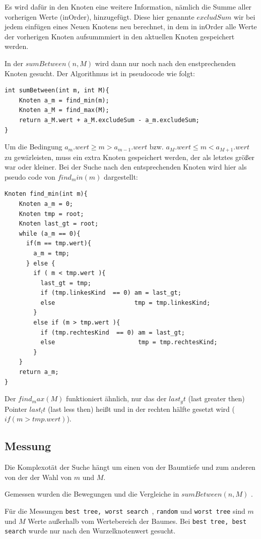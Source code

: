 \documentclass[
   draft=false
  ,paper=a4
  ,twoside=false
  ,fontsize=11pt
  ,headsepline
  ,DIV11
  ,parskip=full+
]{scrartcl} %
\begin{document}
Es wird dafür in den Knoten eine weitere Information, nämlich die Summe aller 
vorherigen Werte (inOrder), hinzugefügt. Diese hier genannte $excludSum$ wir bei jedem
einfügen eines Neuen Knotens neu berechnet, in dem in inOrder alle Werte der
vorherigen Knoten aufsummmiert in den aktuellen Knoten gespeichert werden.

In der $sumBetween(n,M)$ wird dann nur noch nach den enstprechenden Knoten gesucht. Der Algorithmus ist in pseudocode wie folgt:

\begin{lstlisting}
int sumBetween(int m, int M){
	Knoten a_m = find_min(m);
	Knoten a_M = find_max(M);
	return a_M.wert + a_M.excludeSum - a_m.excludeSum;
}
\end{lstlisting}
Um die Bedingung
$a_m.wert \geq m > a_{m-1}.wert$ bzw. $a_M.wert \leq m < a_{M+1}.wert $ zu gewärleisten, muss ein extra Knoten gespeichert werden, der als letztes größer war oder kleiner. 
Bei der Suche nach den entsprechenden Knoten wird hier als pseudo code von 
$find_min(m)$ dargestellt:
  \begin{lstlisting}
Knoten find_min(int m){
	Knoten a_m = 0;
	Knoten tmp = root;
	Knoten last_gt = root;
	while (a_m == 0){
	  if(m == tmp.wert){
	    a_m = tmp;
	  } else {
	    if ( m < tmp.wert ){
	      last_gt = tmp;
	      if (tmp.linkesKind  == 0) am = last_gt;
	      else                      tmp = tmp.linkesKind;
	    }
	    else if (m > tmp.wert ){
	      if (tmp.rechtesKind  == 0) am = last_gt;
	      else                       tmp = tmp.rechtesKind;
	    }
	}
	return a_m;
}
\end{lstlisting}

Der $find _max(M)$ funktioniert ähnlich, nur das der $last_gt$ (last greater then) Pointer $last_lt$ (last less then) heißt und in der rechten hälfte gesetzt wird ($if (m > tmp.wert)$). 
\subsection*{Messung}
Die Komplexotät der Suche hängt um einen von der Baumtiefe und zum anderen von der der Wahl von $m$ und $M$.

Gemessen wurden die Bewegungen und die Vergleiche in $sumBetween(n,M)$ .

Für die Messungen \texttt{best tree, worst search }, \texttt{random} und \texttt{worst tree} sind $m$ und $M$ Werte außerhalb vom Wertebereich der Baumes. Bei \texttt{best tree, best search} wurde nur nach den Wurzelknotenwert gesucht.
\end{document}
